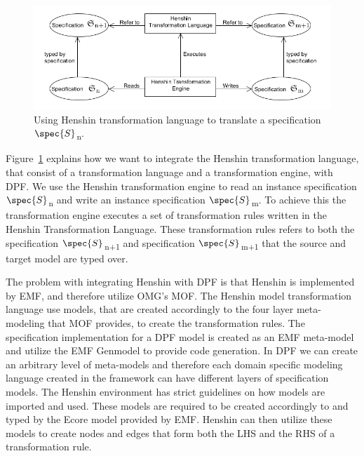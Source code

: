 \begin{figure}[H]
	\centering
	\includegraphics[scale=0.7]{./Figures/TransformationSolutionBasic.png}
	\caption[Integrating Henshin with DPF]
	{Using Henshin transformation language to translate a specification
	$\spec{S}$\textsubscript{n}.}
	\label{fig:Simple_Solution}
\end{figure}

Figure~\ref{fig:Simple_Solution} explains how we want to integrate the Henshin
transformation language, that consist of a transformation language and a
transformation engine, with DPF. We use the Henshin transformation engine to
read an instance specification $\spec{S}$\textsubscript{n} and write an instance
specification $\spec{S}$\textsubscript{m}. To achieve this the transformation
engine executes a set of transformation rules written in the Henshin
Transformation Language. These transformation rules refers to both the
specification $\spec{S}$\textsubscript{n+1} and specification
$\spec{S}$\textsubscript{m+1} that the source and target model are typed over.

The problem with integrating Henshin with DPF is that Henshin is implemented by
EMF, and therefore utilize OMG's MOF. The Henshin model transformation
language use models, that are created accordingly to the four layer
meta-modeling that MOF provides, to create the transformation rules. The
specification implementation for a DPF model is created as an EMF meta-model 
and utilize the EMF Genmodel to provide code generation. In DPF we can create an
arbitrary level of meta-models and therefore each domain specific modeling
language created in the framework can have different layers of specification
models. The Henshin environment has strict guidelines on how models are imported
and used. These models are required to be created accordingly to and typed by
the Ecore model provided by EMF. Henshin can then utilize these models to create
nodes and edges that form both the LHS and the RHS of a transformation rule. 

